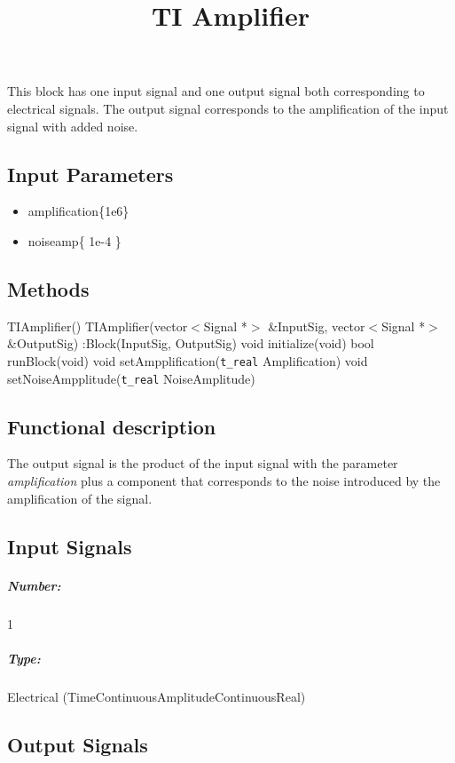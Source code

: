 \documentclass[a4paper]{article}
\title{TI Amplifier}
\begin{document}
\maketitle

This block has one input signal and one output signal both corresponding to electrical signals. The output signal corresponds to the amplification of the input signal with added noise.


\subsection*{Input Parameters}

\begin{itemize}
	\item amplification\{1e6\}
	\item noiseamp\{ 1e-4 \}
\end{itemize}

\subsection*{Methods}
 
TIAmplifier() {}
\bigbreak
TIAmplifier(vector$<$Signal *$>$ \&InputSig, vector$<$Signal *$>$ \&OutputSig) :Block(InputSig, OutputSig) {}
\bigbreak
void initialize(void)
\bigbreak
bool runBlock(void)
\bigbreak
void setAmpplification(\texttt{t\_real} Amplification)
\bigbreak
void setNoiseAmpplitude(\texttt{t\_real} NoiseAmplitude)

\subsection*{Functional description}

The output signal is the product of the input signal with the parameter \textit{amplification} plus a component that corresponds to the noise introduced by the amplification of the signal. 

\pagebreak

\subsection*{Input Signals}

\subparagraph*{Number:} 1

\subparagraph*{Type:} Electrical (TimeContinuousAmplitudeContinuousReal)

\subsection*{Output Signals}
\end{document}
